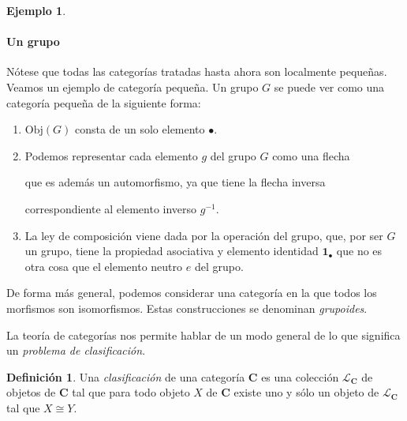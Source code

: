 \documentclass[12pt,a4paper]{book}
\theoremstyle{definition} \newtheorem{defn}[thm]{Definición}
\theoremstyle{definition} \newtheorem{ejemplo}[thm]{Ejemplo}
\theoremstyle{definition} \newtheorem{ejercicio}[thm]{Ejercicio}
\theoremstyle{remark} \newtheorem*{obs}{Observación}
\def\id{\mathbf{1}}
\def\obj{\mathrm{Obj}}
\def\cat{\mathbf{C}}
\begin{document}
\begin{ejemplo}
 

  \paragraph{Un grupo} Nótese que todas las categorías tratadas hasta ahora son localmente pequeñas. Veamos un ejemplo de categoría pequeña. Un grupo $G$ se puede ver como una categoría pequeña de la siguiente forma:
  \begin{enumerate}
    \item $\obj(G)$ consta de un solo elemento $\bullet$.
    \item Podemos representar cada elemento $g$ del grupo $G$ como una flecha
      \begin{center}
      \end{center}
      que es además un automorfismo, ya que tiene la flecha inversa
      \begin{center}
      \end{center}
      correspondiente al elemento inverso $g^{-1}$.
    \item La ley de composición viene dada por la operación del grupo, que, por ser $G$ un grupo, tiene la propiedad asociativa y elemento identidad $\id_{\bullet}$ que no es otra cosa que el elemento neutro $e$ del grupo.
  \end{enumerate}
  De forma más general, podemos considerar una categoría en la que todos los morfismos son isomorfismos. Estas construcciones se denominan \emph{grupoides}.
\end{ejemplo}

La teoría de categorías nos permite hablar de un modo general de lo que significa un \emph{problema de clasificación}.

\begin{defn}
  Una \emph{clasificación} de una categoría $\cat$ es una colección $\mathcal{L}_{\cat}$ de objetos de $\cat$ tal que para todo objeto $X$ de $\cat$ existe uno y sólo un objeto de $\mathcal{L}_{\cat}$ tal que $X\cong Y$. 
\end{defn}
\end{document}
